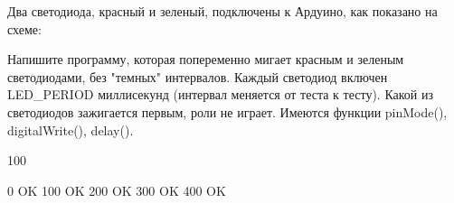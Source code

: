 
Два светодиода, красный и зеленый, подключены к Ардуино, как показано на схеме:


Напишите программу, которая попеременно мигает красным и зеленым светодиодами, без "темных" 
интервалов.  Каждый светодиод включен LED\_PERIOD миллисекунд (интервал меняется от теста к тесту).  
Какой из светодиодов зажигается первым,  роли не играет.  Имеются функции  pinMode(), 
digitalWrite(), delay().  

\begin{myverbbox}[\small]{\vinput}
    100
\end{myverbbox}
\begin{myverbbox}[\small]{\voutput}
    0 OK
    100 OK
    200 OK
    300 OK
    400 OK
\end{myverbbox}

